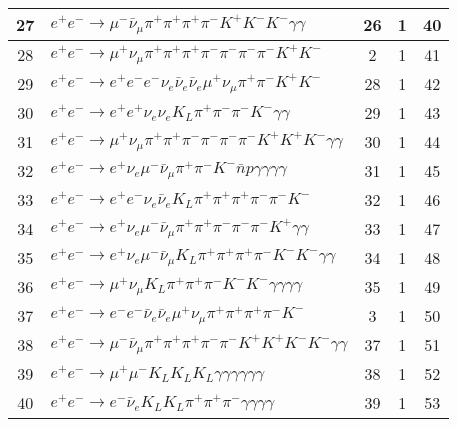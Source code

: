 \documentclass[landscape]{article}
\begin{document}
\begin{table}[htbp!]
\begin{tabular}{|c|>{\centering}p{18cm}|c|c|c|}
\hline
27 & $ e^{+} e^{-} \rightarrow \mu^{-} \bar{\nu}_{\mu} \pi^{+} \pi^{+} \pi^{+} \pi^{-} K^{+} K^{-} K^{-} \gamma \gamma $ & 26 & 1 & 40 \\
\hline
28 & $ e^{+} e^{-} \rightarrow \mu^{+} \nu_{\mu} \pi^{+} \pi^{+} \pi^{+} \pi^{-} \pi^{-} \pi^{-} \pi^{-} K^{+} K^{-} $ & 2 & 1 & 41 \\
\hline
29 & $ e^{+} e^{-} \rightarrow e^{+} e^{-} e^{-} \nu_{e} \bar{\nu}_{e} \bar{\nu}_{e} \mu^{+} \nu_{\mu} \pi^{+} \pi^{-} K^{+} K^{-} $ & 28 & 1 & 42 \\
\hline
30 & $ e^{+} e^{-} \rightarrow e^{+} e^{+} \nu_{e} \nu_{e} K_{L} \pi^{+} \pi^{-} \pi^{-} K^{-} \gamma \gamma $ & 29 & 1 & 43 \\
\hline
31 & $ e^{+} e^{-} \rightarrow \mu^{+} \nu_{\mu} \pi^{+} \pi^{+} \pi^{-} \pi^{-} \pi^{-} \pi^{-} K^{+} K^{+} K^{-} \gamma \gamma $ & 30 & 1 & 44 \\
\hline
32 & $ e^{+} e^{-} \rightarrow e^{+} \nu_{e} \mu^{-} \bar{\nu}_{\mu} \pi^{+} \pi^{-} K^{-} \bar{n} p \gamma \gamma \gamma \gamma $ & 31 & 1 & 45 \\
\hline
33 & $ e^{+} e^{-} \rightarrow e^{+} e^{-} \nu_{e} \bar{\nu}_{e} K_{L} \pi^{+} \pi^{+} \pi^{+} \pi^{-} \pi^{-} K^{-} $ & 32 & 1 & 46 \\
\hline
34 & $ e^{+} e^{-} \rightarrow e^{+} \nu_{e} \mu^{-} \bar{\nu}_{\mu} \pi^{+} \pi^{+} \pi^{-} \pi^{-} \pi^{-} K^{+} \gamma \gamma $ & 33 & 1 & 47 \\
\hline
35 & $ e^{+} e^{-} \rightarrow e^{+} \nu_{e} \mu^{-} \bar{\nu}_{\mu} K_{L} \pi^{+} \pi^{+} \pi^{+} \pi^{-} K^{-} K^{-} \gamma \gamma $ & 34 & 1 & 48 \\
\hline
36 & $ e^{+} e^{-} \rightarrow \mu^{+} \nu_{\mu} K_{L} \pi^{+} \pi^{+} \pi^{-} K^{-} K^{-} \gamma \gamma \gamma \gamma $ & 35 & 1 & 49 \\
\hline
37 & $ e^{+} e^{-} \rightarrow e^{-} e^{-} \bar{\nu}_{e} \bar{\nu}_{e} \mu^{+} \nu_{\mu} \pi^{+} \pi^{+} \pi^{+} \pi^{-} K^{-} $ & 3 & 1 & 50 \\
\hline
38 & $ e^{+} e^{-} \rightarrow \mu^{-} \bar{\nu}_{\mu} \pi^{+} \pi^{+} \pi^{+} \pi^{-} \pi^{-} K^{+} K^{+} K^{-} K^{-} \gamma \gamma $ & 37 & 1 & 51 \\
\hline
39 & $ e^{+} e^{-} \rightarrow \mu^{+} \mu^{-} K_{L} K_{L} K_{L} \gamma \gamma \gamma \gamma \gamma \gamma $ & 38 & 1 & 52 \\
\hline
40 & $ e^{+} e^{-} \rightarrow e^{-} \bar{\nu}_{e} K_{L} K_{L} \pi^{+} \pi^{+} \pi^{-} \gamma \gamma \gamma \gamma $ & 39 & 1 & 53 \\
\hline
\end{tabular}
\end{table}
\end{document}
